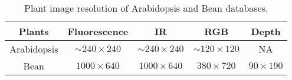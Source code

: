 \begin{table*}
\begin{center}
\caption{Plant image resolution of Arabidopsis and Bean databases.}
\label{tab:resolution}
\begin{tabular}{c|c|c|c|c}
      \hline
      Plants     & Fluorescence       & IR        & RGB      & Depth     \\
      \hline
      Arabidopsis &  $\sim$$240\times240$ &  $\sim$$240\times240$  & $\sim$$120\times120$  & NA  \\
      Bean        & $1000\times640$ & $1000\times640$ & $380\times720$ & $90\times190$    \\
      \hline
\end{tabular}
\end{center}
\end{table*}
